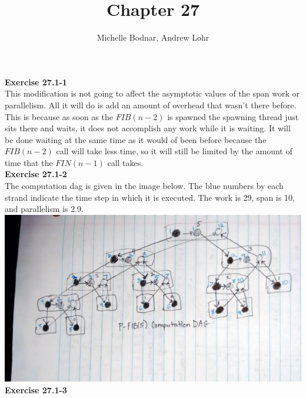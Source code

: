 \documentclass{article}
\title{Chapter 27}
\author{Michelle Bodnar, Andrew Lohr}
\begin{document}
\maketitle
\noindent\textbf{Exercise 27.1-1}\\

This modification is not going to affect the asymptotic values of the span work or parallelism. All it will do is add an amount of overhead that wasn't there before. This is because as soon as the $FIB(n-2)$ is spawned the spawning thread just sits there and waits, it does not accomplish any work while it is waiting. It will be done waiting at the same time as it would of been before because the $FIB(n-2)$ call will take less time, so it will still be limited by the amount of time that the $FIN(n-1)$ call takes.\\

\noindent\textbf{Exercise 27.1-2}\\

The computation dag is given in the image below.  The blue numbers by each strand indicate the time step in which it is executed. The work is 29, span is 10, and parallelism is 2.9.  \\

\includegraphics[scale=.1]{FibCompDag.jpg}\\

\noindent\textbf{Exercise 27.1-3}\\
\end{document}
